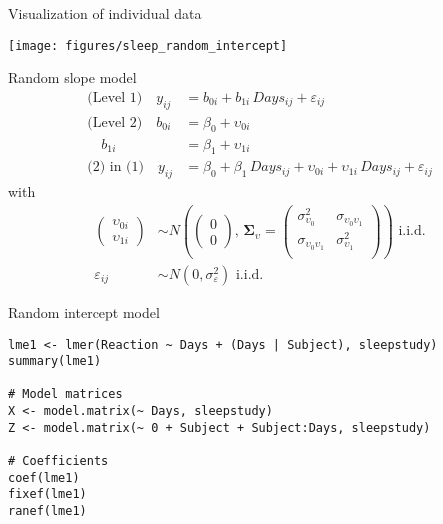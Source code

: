 \documentclass[aspectratio=169]{beamer}
\newcommand{\gmat}[1]{\boldsymbol{#1}}
\begin{document}
\begin{frame}{Visualization of individual data}
  \begin{center}
      \texttt{[image: figures/sleep\_random\_intercept]}
  \end{center}
\end{frame}


\begin{frame}[fragile]{Random slope model}
\begin{align*}
\text{(Level 1)}  \quad y_{ij} &= b_{0i} + b_{1i}\,Days_{ij} + \varepsilon_{ij}\\
\text{(Level 2)}  \quad b_{0i} &= \beta_0 + \upsilon_{0i}\\
                  \quad b_{1i} &= \beta_1 + \upsilon_{1i}\\
\text{(2) in (1)} \quad y_{ij} &= \beta_0 + \beta_1\,Days_{ij} +
                   \upsilon_{0i} + \upsilon_{1i} \, Days_{ij}+ \varepsilon_{ij}
\end{align*}
with
\begin{align*}
  \begin{pmatrix} \upsilon_{0i}\\ \upsilon_{1i} \end{pmatrix} &\sim
    N \left(\begin{pmatrix} 0\\ 0 \end{pmatrix}, \, \gmat{\Sigma}_\upsilon =
      \begin{pmatrix}
        \sigma^2_{\upsilon_0} & \sigma_{\upsilon_0 \upsilon_1} \\
        \sigma_{\upsilon_0 \upsilon_1} & \sigma^2_{\upsilon_1} \\
      \end{pmatrix} \right)
    \text{ i.i.d.} \\
  \varepsilon_{ij} & \sim N(0, \sigma_{\varepsilon}^2)
    \text{ i.i.d.}
\end{align*}
\end{frame}

{

\begin{frame}[fragile]{Random intercept model}
\begin{lstlisting}
lme1 <- lmer(Reaction ~ Days + (Days | Subject), sleepstudy)
summary(lme1)

# Model matrices
X <- model.matrix(~ Days, sleepstudy)
Z <- model.matrix(~ 0 + Subject + Subject:Days, sleepstudy)

# Coefficients
coef(lme1)
fixef(lme1)
ranef(lme1)
\end{lstlisting}
\end{frame}

}
\end{document}
